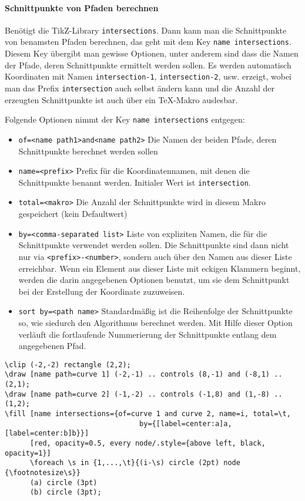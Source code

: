 \documentclass[a4paper,ngerman,10pt]{scrartcl}
\begin{document}
\paragraph*{Schnittpunkte von Pfaden berechnen}
Benötigt die TikZ-Library \verb!intersections!. Dann kann man die Schnittpunkte von benamsten Pfaden berechnen, das geht mit dem Key \verb!name intersections!. Diesem Key übergibt man gewisse Optionen, unter anderem sind dass die Namen der Pfade, deren Schnittpunkte ermittelt werden sollen. Es werden automatisch Koordinaten mit Namen \verb!intersection-1!, \verb!intersection-2!, usw. erzeigt, wobei man das Prefix \verb!intersection! auch selbst ändern kann und die Anzahl der erzeugten Schnittpunkte ist auch über ein TeX-Makro auslesbar.

Folgende Optionen nimmt der Key \verb!name intersections! entgegen:

\begin{itemize}
\item \verb!of=<name path1>and<name path2>! Die Namen der beiden Pfade, deren Schnittpunkte berechnet werden sollen
\item \verb!name=<prefix>! Prefix für die Koordinatennamen, mit denen die Schnittpunkte benannt werden. Initialer Wert ist \verb!intersection!.
\item \verb!total=<makro>! Die Anzahl der Schnittpunkte wird in diesem Makro gespeichert (kein Defaultwert)
\item \verb!by=<comma-separated list>! Liste von expliziten Namen, die für die Schnittpunkte verwendet werden sollen. Die Schnittpunkte sind dann nicht nur via \verb!<prefix>-<number>!, sondern auch über den Namen aus dieser Liste erreichbar. Wenn ein Element aus dieser Liste mit eckigen Klammern beginnt, werden die darin angegebenen Optionen benutzt, um sie dem Schnittpunkt bei der Erstellung der Koordinate zuzuweisen.
\item \verb!sort by=<path name>! Standardmäßig ist die Reihenfolge der Schnittpunkte so, wie siedurch den Algorithmus berechnet werden. Mit Hilfe dieser Option verläuft die fortlaufende Nummerierung der Schnittpunkte entlang dem angegebenen Pfad.
\end{itemize}

\begin{verbatim}
\clip (-2,-2) rectangle (2,2);
\draw [name path=curve 1] (-2,-1) .. controls (8,-1) and (-8,1) .. (2,1);
\draw [name path=curve 2] (-1,-2) .. controls (-1,8) and (1,-8) .. (1,2);
\fill [name intersections={of=curve 1 and curve 2, name=i, total=\t,
                                by={[label=center:a]a,[label=center:b]b}}]
      [red, opacity=0.5, every node/.style={above left, black, opacity=1}]
      \foreach \s in {1,...,\t}{(i-\s) circle (2pt) node {\footnotesize\s}}
      (a) circle (3pt)
      (b) circle (3pt);\end{verbatim}
\end{document}

